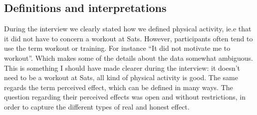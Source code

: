\subsection{Definitions and interpretations }
During the interview we clearly stated how we defined physical activity, ie.e that it did not have to concern a workout at Sats. However, participants often tend to use the term workout or training. For instance “It did not motivate me to workout”. Which makes some of the details about the data somewhat ambiguous. This is something I should have made clearer during the interview: it doesn't need to be a workout at Sats, all kind of physical activity is good.
The same regards the term perceived effect, which can be defined in many ways. The question regarding their perceived effects was open and without restrictions, in order to capture the different types of real and honest effect.


